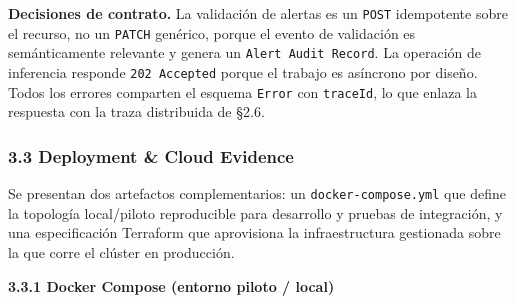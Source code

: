 \documentclass{article}
\newcommand{\mdhfour}[1]{\par\medskip\noindent\textbf{#1}\par\nobreak\smallskip}
\begin{document}
\textbf{Decisiones de contrato.} La validación de alertas es un \texttt{POST} idempotente sobre el recurso, no un \texttt{PATCH} genérico, porque el evento de validación es semánticamente relevante y genera un \texttt{Alert Audit Record}. La operación de inferencia responde \texttt{202 Accepted} porque el trabajo es asíncrono por diseño. Todos los errores comparten el esquema \texttt{Error} con \texttt{traceId}, lo que enlaza la respuesta con la traza distribuida de \S{}2.6.

\subsubsection{3.3 Deployment \& Cloud Evidence}

Se presentan dos artefactos complementarios: un \texttt{docker-\allowbreak{}compose.\allowbreak{}yml} que define la topología local/piloto reproducible para desarrollo y pruebas de integración, y una especificación Terraform que aprovisiona la infraestructura gestionada sobre la que corre el clúster en producción.

\mdhfour{3.3.1 Docker Compose (entorno piloto / local)}
\end{document}
